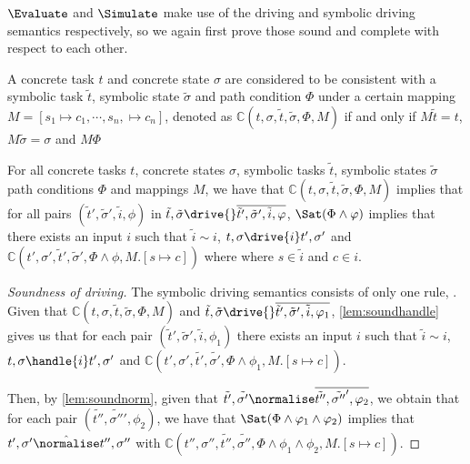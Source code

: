 
$\Evaluate$ and $\Simulate$ make use of the driving and symbolic driving semantics respectively, so we again first prove those sound and complete with respect to each other.


\begin{definition}
A concrete task $t$ and concrete state $\sigma$
are considered to be consistent with a symbolic task $\tilde{t}$, symbolic state $\tilde{\sigma}$ and path condition $\Phi$
under a certain mapping $M=[s_1\mapsto c_1,\cdots,s_n,\mapsto c_n]$, denoted as $\mathds{C}(t,\sigma,\tilde{t},\tilde{\sigma},\Phi,M)$
if and only if $M\tilde{t}=t$, $M\tilde{\sigma}=\sigma$ and $M\Phi$
\end{definition}

\begin{lemma}
  \label{lem:sounddriving}
  For all concrete tasks $t$, concrete states $\sigma$, symbolic tasks $\tilde{t}$, symbolic states $\tilde{\sigma}$ path conditions $\Phi$ and mappings $M$,
  we have that $\mathds{C}(t,\sigma,\tilde{t},\tilde{\sigma},\Phi,M)$ implies
  that for all pairs $(\tilde{t}',\tilde{\sigma}',\tilde{i},\phi)$ in $\tilde{t},\tilde{\sigma}\drive{}\overline{\tilde{t}',\tilde{\sigma}',\tilde{i},\phi}$,
  $\Sat(\Phi\land\phi)$ implies that there exists an input $i$ such that $\tilde{i}\sim i$,  $t,\sigma\drive{i}t',\sigma'$ and $\mathds{C}(t',\sigma',\tilde{t}',\tilde{\sigma}',\Phi\land\phi,M.[s\mapsto c])$ where where $s\in\tilde{i}$ and $c\in i$.
\end{lemma}

\begin{proof}[Soundness of driving]
  The symbolic driving semantics consists of only one rule, .
  Given that $\mathds{C}(t,\sigma,\tilde{t},\tilde{\sigma},\Phi,M)$ and $\tilde{t},\tilde{\sigma}\drive{}\overline{\tilde{t}',\tilde{\sigma}',\tilde{i},\phi_1}$,
  \cref{lem:soundhandle} gives us that for each pair $(\tilde{t}',\tilde{\sigma}',\tilde{i},\phi_1)$
  there exists an input $i$ such that $\tilde{i}\sim i$, $t,\sigma\handle{i}t',\sigma'$
  and $\mathds{C}(t',\sigma',\tilde{t'},\tilde{\sigma'},\Phi\land\phi_1,M.[s\mapsto c])$.

  Then, by \cref{lem:soundnorm}, given that $\tilde{t'},\tilde{\sigma'}\normalise\overline{\tilde{t''},\tilde{\sigma''}',\phi_2}$,
  we obtain that for each pair $(\tilde{t''},\tilde{\sigma''}',\phi_2)$, we have that $\Sat(\Phi\land\phi_1\land\phi_2)$ implies
  that $t',\sigma'\hat{\normalise}t'',\sigma''$ with $\mathds{C}(t'',\sigma'',\tilde{t''},\tilde{\sigma''},\Phi\land\phi_1\land\phi_2,M.[s\mapsto c])$.
\end{proof}




